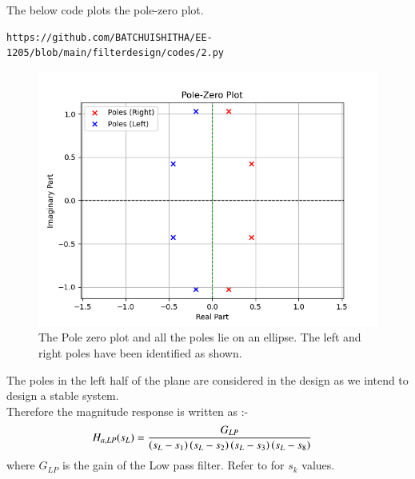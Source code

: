 \documentclass{article}
\begin{document}
\begin{enumerate}
The below code plots the pole-zero plot.
\begin{lstlisting}
https://github.com/BATCHUISHITHA/EE-1205/blob/main/filterdesign/codes/2.py
\end{lstlisting}
\begin{figure}[H]
\centering
\includegraphics[width=1\columnwidth]{figs/2.png}
\caption{The Pole zero plot and all the poles lie on an ellipse. The left and right poles have been identified as shown.}
\label{fig:pole_zero_plt}
\end{figure}
The poles in the left half of the plane are considered in the design as we intend to design a stable system.\\
Therefore the magnitude response is written as :- 
\begin{align}
    H_{a,LP}(s_L) &= \frac{G_{LP}}{\left(s_L-s_1\right)\left(s_L-s_2\right)\left(s_L-s_3\right)\left(s_L-s_8\right)}
\end{align}
where $G_{LP}$ is the gain of the Low pass filter. Refer to  for $s_k$ values.\\


\end{enumerate}
\end{document}
